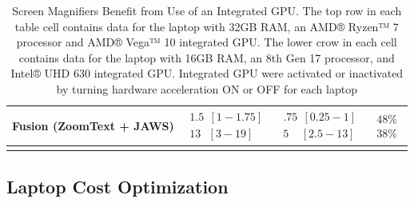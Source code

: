 \begin{longtable}[]{
>{\raggedright\arraybackslash}m{}
>{\raggedright\arraybackslash}m{}
>{\raggedright\arraybackslash}m{}
>{\raggedright\arraybackslash}m{}
}
Fusion (ZoomText + JAWS) & $\begin{array}{l}1.5~~[1-1.75] \\13~~~[3-19]\end{array}$ & $\begin{array}{l}.75~~[0.25-1] \\5~~~~~[2.5-13]\end{array}$ & $\begin{array}{l} 48\% \\ 38\%\end{array}$ \\[1.0em]\hline
\caption[Screen Magnifiers Benefit from Integrated GPU]{Screen Magnifiers Benefit from Use of an Integrated GPU. The top row in each table cell contains data for the laptop with 32GB RAM, an AMD® Ryzen™ 7 processor and AMD® Vega™  10 integrated GPU. The lower crow in each cell contains data for the laptop with 16GB RAM, an 8th Gen 17 processor, and Intel® UHD 630 integrated GPU. Integrated GPU were activated or inactivated by turning hardware acceleration ON or OFF for each laptop} \label{tab:table51}
\end{longtable}

\pagebreak \hypertarget{optimizing-cost-with-performance}{}\subsection{Laptop Cost Optimization}\label{optimizing-cost-with-performance}

